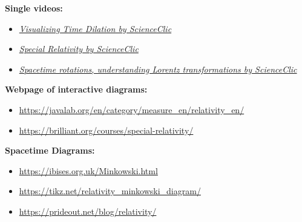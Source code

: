 \textbf{Single videos:}
\begin{itemize}
    \item \href{https://www.youtube.com/watch?v=5qQheJn-FHc&list=PLu7cY2CPiRjVCbSWwSe0mXxWK0S8e8Ssx&index=12}{\textit{Visualizing Time Dilation by ScienceClic}}
    \item \href{https://www.youtube.com/watch?v=uTyAI1LbdgA&list=PLu7cY2CPiRjVCbSWwSe0mXxWK0S8e8Ssx&index=18}{\textit{Special Relativity by ScienceClic}}
    \item \href{https://www.youtube.com/watch?v=qdycfWfAtsM&list=PLu7cY2CPiRjVCbSWwSe0mXxWK0S8e8Ssx&index=17}{\textit{Spacetime rotations, understanding Lorentz transformations by ScienceClic}}
\end{itemize}

\textbf{Webpage of interactive diagrams:}
\begin{itemize}
    \item \url{https://javalab.org/en/category/measure_en/relativity_en/}
    \item \url{https://brilliant.org/courses/special-relativity/}
\end{itemize}


\textbf{Spacetime Diagrams:}
\begin{itemize}
    \item \url{https://ibises.org.uk/Minkowski.html}
    \item \url{https://tikz.net/relativity_minkowski_diagram/}
    \item \url{https://prideout.net/blog/relativity/}
\end{itemize}